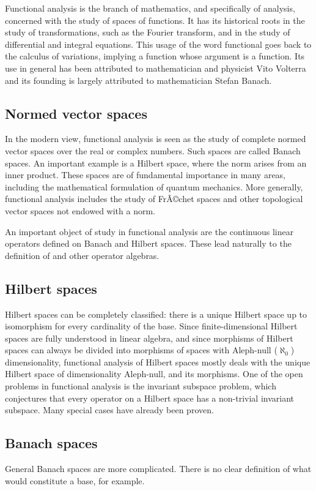 \documentclass[12pt]{article}
\begin{document}
Functional analysis is the branch of mathematics, and specifically of analysis, concerned with the study of spaces of functions. It has its historical roots in the study of transformations, such as the Fourier transform, and in the study of differential and integral equations. This usage of the word functional goes back to the calculus of variations, implying a function whose argument is a function. Its use in general has been attributed to mathematician and physicist Vito Volterra and its founding is largely attributed to mathematician Stefan Banach.

\subsection{Normed vector spaces}
In the modern view, functional analysis is seen as the study of complete normed vector spaces over the real or complex numbers. Such spaces are called Banach spaces. An important example is a Hilbert space, where the norm arises from an inner product. These spaces are of fundamental importance in many areas, including the mathematical formulation of quantum mechanics. More generally, functional analysis includes the study of FrÃ©chet spaces and other topological vector spaces not endowed with a norm.

An important object of study in functional analysis are the continuous linear operators defined on Banach and Hilbert spaces. These lead naturally to the definition of  and other operator algebras.

\subsection{Hilbert spaces}
Hilbert spaces can be completely classified: there is a unique Hilbert space up to isomorphism for every cardinality of the base. Since finite-dimensional Hilbert spaces are fully understood in linear algebra, and since morphisms of Hilbert spaces can always be divided into morphisms of spaces with Aleph-null ($\aleph_0$) dimensionality, functional analysis of Hilbert spaces mostly deals with the unique Hilbert space of dimensionality Aleph-null, and its morphisms. One of the open problems in functional analysis is the invariant subspace problem, which conjectures that every operator on a Hilbert space has a non-trivial invariant subspace. Many special cases have already been proven.

\subsection{Banach spaces}
General Banach spaces are more complicated. There is no clear definition of what would constitute a base, for example.
\end{document}
